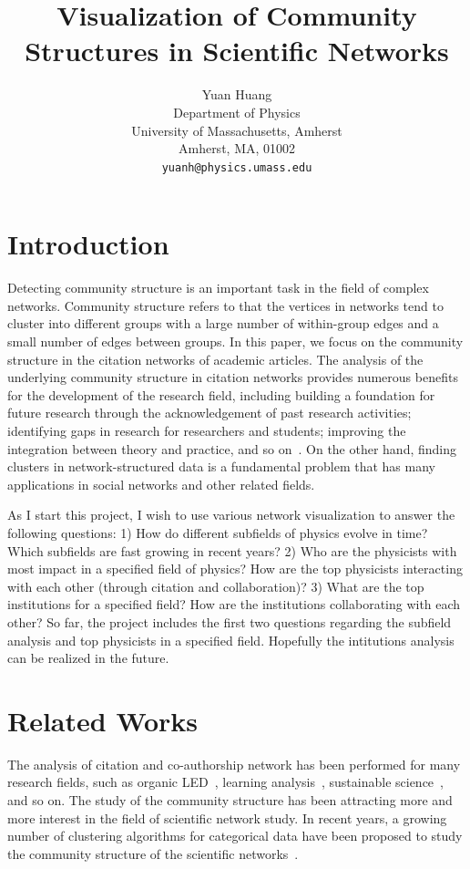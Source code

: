 \documentclass{article} %
\title{Visualization of Community Structures in Scientific Networks}
\author{
Yuan Huang \\
Department of Physics\\
University of Massachusetts, Amherst\\
Amherst, MA, 01002 \\
\texttt{yuanh@physics.umass.edu} \\
}
\begin{document}
\maketitle

\section{Introduction}
\label{intro}

Detecting community structure is an important task in the field of complex networks. Community structure refers to that the vertices in networks tend to cluster into different groups with a large number of within-group edges and a small number of edges between groups. In this paper, we focus on the community structure in the citation networks of academic articles. The analysis of the underlying community structure in citation networks provides numerous benefits for the development of the research field, including building a foundation for future research through the acknowledgement of past research activities; identifying gaps in research for researchers and students; improving the integration between theory and practice, and so on~\cite{phys_rev, OLED, learning_analytics, sustain}. On the other hand, finding clusters in network-structured data is a fundamental problem that has many applications in social networks and other related fields. 

As I start this project, I wish to use various network visualization to answer the following questions: 1) How do different subfields of physics evolve in time? Which subfields are fast growing in recent years? 2) Who are the physicists with most impact in a specified field of physics? How are the top physicists interacting with each other (through citation and collaboration)? 3) What are the top institutions for a specified field? How are the institutions collaborating with each other? So far, the project includes the first two questions regarding the subfield analysis and top physicists in a specified field. Hopefully the intitutions analysis can be realized in the future.



\section{Related Works}
\label{related}
The analysis of citation and co-authorship network has been performed for many research fields, such as organic LED~\cite{OLED}, learning analysis~\cite{learning_analytics}, sustainable science~\cite{sustain}, and so on. The study of the community structure has been attracting more and more interest in the field of scientific network study. In recent years, a growing number of clustering algorithms for categorical data have been proposed to study the community structure of the scientific networks~\cite{Newman_divisive, bottom_up, new_method, Newman_evaluation,  method_review, Newman_algorithm}. 
\end{document}
